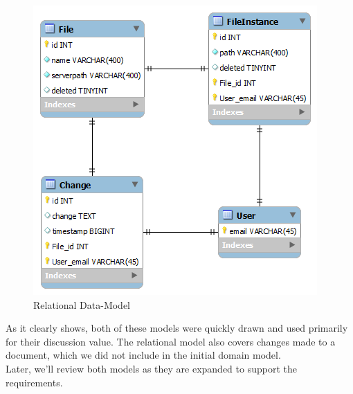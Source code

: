 \begin{figure}[H]
  \includegraphics[width=\textwidth,natwidth=410,natheight=418]{illustrations/RelationalData-model.png}
  \caption{Relational Data-Model}
  \label{relationalmodel}
\end{figure}
As it clearly shows, both of these models were quickly drawn and used primarily for their discussion value. The relational model also covers changes made to a document, which we did not include in the initial domain model.\\
Later, we’ll review both models as they are expanded to support the requirements.\\
